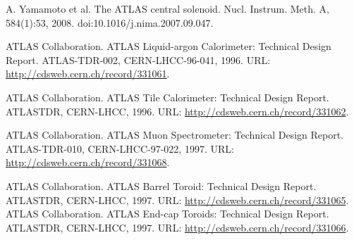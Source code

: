 \begin{thebibliography}{99}
 A. Yamamoto et al. The ATLAS central solenoid. Nucl. Instrum. Meth. A, 584(1):53, 2008. doi:10.1016/j.nima.2007.09.047.

ATLAS Collaboration. ATLAS Liquid-argon Calorimeter: Technical Design Report. ATLAS-TDR-002, CERN-LHCC-96-041, 1996. URL: \url{http://cdsweb.cern.ch/record/331061}.

 ATLAS Collaboration. ATLAS Tile Calorimeter: Technical Design Report. ATLASTDR, CERN-LHCC, 1996. URL: \url{http://cdsweb.cern.ch/record/331062}.

 ATLAS Collaboration. ATLAS Muon Spectrometer: Technical Design Report. ATLAS-TDR-010, CERN-LHCC-97-022, 1997. URL: \url{http://cdsweb.cern.ch/record/331068}.

 ATLAS Collaboration. ATLAS Barrel Toroid: Technical Design Report. ATLASTDR, CERN\--LHCC, 1997. URL: \url{http://cdsweb.cern.ch/record/331065}.
 ATLAS Collaboration. ATLAS End-cap Toroids: Technical Design Report. ATLASTDR, CERN\--LHCC, 1997. URL: \url{http://cdsweb.cern.ch/record/331066}.






\end{thebibliography}
